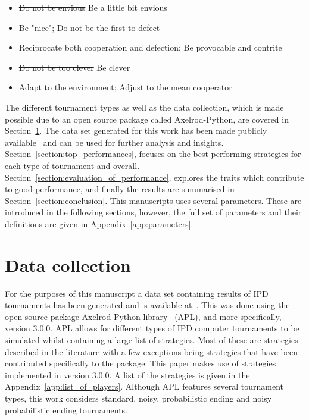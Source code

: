\documentclass{article}
\newcommand{\numberofstrategies}{}
\begin{document}
\begin{itemize}
    \item \st{Do not be envious} Be a little bit envious
    \item Be "nice"; Do not be the first to defect
    \item Reciprocate both cooperation and defection; Be provocable and contrite
    \item \st{Do not be too clever} Be clever
    \item Adapt to the environment; Adjust to the mean cooperator
\end{itemize}

The different tournament types as well as the data collection, which is made
possible due to an open source package called Axelrod-Python,
are covered in Section~\ref{section:data_collection}. The data set generated
for this work has been made publicly available~\cite{data} and can be used
for further analysis and insights.
Section~\ref{section:top_performances}, focuses on the best performing
strategies for each type of tournament and overall.
Section~\ref{section:evaluation_of_performance}, explores the traits which
contribute to good performance, and finally the results are summarised in
Section~\ref{section:conclusion}. This manuscripts uses several parameters.
These are introduced in the following sections, however, the full set of
parameters and their definitions are given in Appendix~\ref{app:parameters}.

\section{Data collection}\label{section:data_collection}

For the purposes of this manuscript a data set containing results of IPD
tournaments has been generated and is available at~\cite{data}. This was done using the
open source package Axelrod-Python library~\cite{axelrodproject} (APL), and more specifically,
version 3.0.0. APL allows for different types of IPD computer
tournaments to be simulated whilst containing a large list of strategies.
Most of these are strategies described in the literature with a few exceptions
being strategies that have been contributed specifically to the package. This
paper makes use of \numberofstrategies strategies implemented in version 3.0.0. A
list of the strategies is given in the Appendix~\ref{app:list_of_players}.
Although APL features several tournament types, this work considers
standard, noisy, probabilistic ending and noisy probabilistic ending
tournaments.
\end{document}
